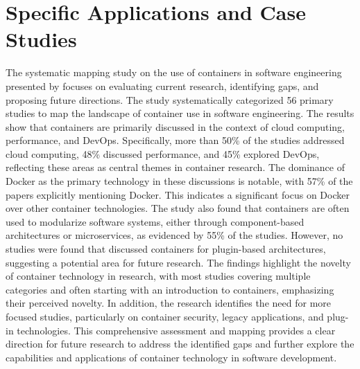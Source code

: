 \section{Specific Applications and Case Studies}

The systematic mapping study on the use of containers in software engineering presented by \citet{koskinenContainersSoftwareDevelopment2019} focuses on evaluating current research, identifying gaps, and proposing future directions.
The study systematically categorized 56 primary studies to map the landscape of container use in software engineering.
The results show that containers are primarily discussed in the context of cloud computing, performance, and DevOps.
Specifically, more than 50\% of the studies addressed cloud computing, 48\% discussed performance, and 45\% explored DevOps, reflecting these areas as central themes in container research.
The dominance of Docker as the primary technology in these discussions is notable, with 57\% of the papers explicitly mentioning Docker.
This indicates a significant focus on Docker over other container technologies.
The study also found that containers are often used to modularize software systems, either through component-based architectures or microservices, as evidenced by 55\% of the studies.
However, no studies were found that discussed containers for plugin-based architectures, suggesting a potential area for future research.
The findings highlight the novelty of container technology in research, with most studies covering multiple categories and often starting with an introduction to containers, emphasizing their perceived novelty.
In addition, the research identifies the need for more focused studies, particularly on container security, legacy applications, and plug-in technologies.
This comprehensive assessment and mapping provides a clear direction for future research to address the identified gaps and further explore the capabilities and applications of container technology in software development.

